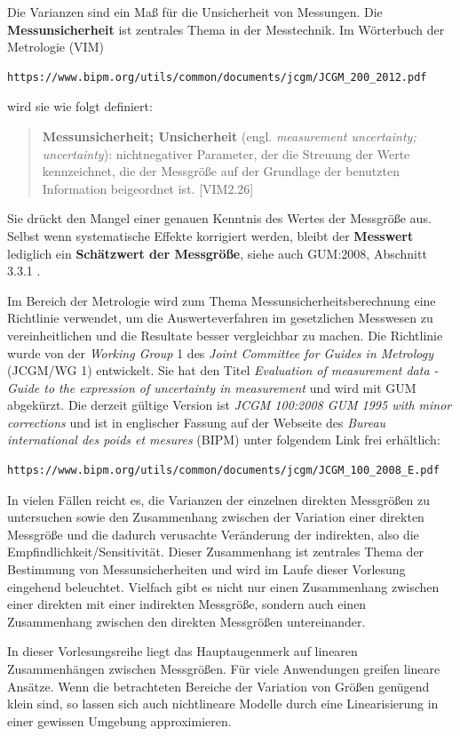 Die Varianzen sind ein Maß für die Unsicherheit von Messungen. Die \textbf{Messunsicherheit} ist zentrales Thema in der Messtechnik.
Im Wörterbuch der Metrologie (VIM)
\begin{verbatim}
https://www.bipm.org/utils/common/documents/jcgm/JCGM_200_2012.pdf
\end{verbatim}
wird sie wie folgt definiert:
\begin{quote}
\textbf{Messunsicherheit; Unsicherheit} (engl. \textsl{measurement uncertainty; uncertainty}): 
nichtnegativer Parameter, der die Streuung der Werte kennzeichnet, die der Messgröße
auf der Grundlage der benutzten Information beigeordnet ist. [VIM2.26]
\end{quote}
Sie drückt den Mangel einer genauen Kenntnis des Wertes der Messgröße aus.
Selbst wenn systematische Effekte korrigiert werden, bleibt der \textbf{Messwert} lediglich
ein \textbf{Schätz\-wert der Messgröße}, siehe auch GUM:2008, Abschnitt 3.3.1 .

Im Bereich der Metrologie wird zum Thema Messunsicherheitsberechnung eine Richtlinie verwendet,
um die Auswerteverfahren im gesetzlichen Messwesen zu vereinheitlichen und die Resultate
besser vergleichbar zu machen. Die Richtlinie wurde von der
\textsl{Working Group} 1 des \textsl{Joint Committee for Guides in Metrology} (JCGM/WG 1)
entwickelt. Sie hat den Titel \textsl{Evaluation of measurement
data - Guide to the expression of uncertainty in measurement} und wird mit GUM abgekürzt.
Die derzeit gültige Version ist
\textsl{JCGM 100:2008 GUM 1995 with minor corrections} und ist in englischer Fassung
auf der Webseite des \textsl{Bureau international des poids et mesures} (BIPM)
unter folgendem Link frei erhältlich:
\begin{verbatim}
https://www.bipm.org/utils/common/documents/jcgm/JCGM_100_2008_E.pdf
\end{verbatim}

In vielen Fällen reicht es, die Varianzen der einzelnen direkten Messgrößen zu untersuchen sowie
den Zusammenhang zwischen der Variation einer direkten Messgröße und die dadurch verusachte
Veränderung der indirekten, also die Empfindlichkeit/Sensitivität.
Dieser Zusammenhang ist zentrales Thema der Bestimmung von Messunsicherheiten
und wird im Laufe dieser Vorlesung eingehend beleuchtet.
Vielfach gibt es nicht nur einen Zusammenhang zwischen einer direkten mit einer indirekten Messgröße,
sondern auch einen Zusammenhang zwischen den direkten Messgrößen untereinander.

In dieser Vorlesungsreihe liegt das Hauptaugenmerk auf linearen Zusammenhängen zwischen Messgrößen.
Für viele Anwendungen greifen lineare Ansätze. Wenn die betrachteten Bereiche der Variation von Größen
genügend klein sind, so lassen sich auch nichtlineare Modelle durch eine Linearisierung in einer gewissen
Umgebung approximieren.

